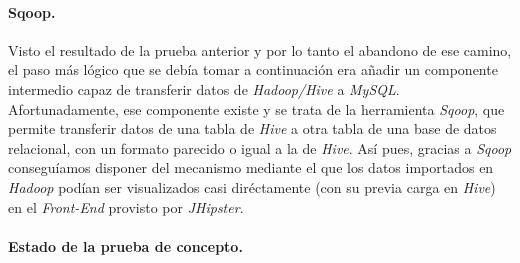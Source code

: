 \paragraph*{Sqoop.}
\par
Visto el resultado de la prueba anterior y por lo tanto el abandono de ese camino, el paso más lógico que se debía tomar a continuación era añadir un componente intermedio capaz de transferir datos de \textit{Hadoop/Hive} a \textit{MySQL}. Afortunadamente, ese componente existe y se trata de la herramienta \textit{Sqoop}, que permite transferir datos de una tabla de \textit{Hive} a otra tabla de una base de datos relacional, con un formato parecido o igual a la de \textit{Hive}. Así pues, gracias a \textit{Sqoop} conseguíamos disponer del mecanismo mediante el que los datos importados en \textit{Hadoop} podían ser visualizados casi diréctamente (con su previa carga en \textit{Hive}) en el \textit{Front-End} provisto por \textit{JHipster}. 


\bigskip
\par
\paragraph*{Estado de la prueba de concepto.}

